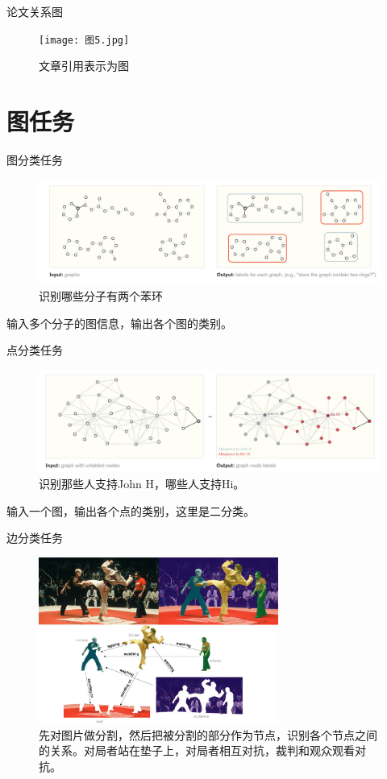 \documentclass{beamer}
\begin{document}
\begin{frame}{论文关系图}
    \begin{figure}
        \texttt{[image: 图5.jpg]}
        \caption{文章引用表示为图}
    \end{figure}
\end{frame}

\section{图任务}

\begin{frame}{图分类任务}
    \begin{figure}
        \includegraphics[width=\textwidth]{全局分类.jpg}
        \caption{识别哪些分子有两个苯环}
    \end{figure}
    输入多个分子的图信息，输出各个图的类别。
\end{frame}

\begin{frame}{点分类任务}
    \begin{figure}
        \includegraphics[width=\textwidth]{点分类.jpg}
        \caption{识别那些人支持John H，哪些人支持Hi。}
    \end{figure}
    输入一个图，输出各个点的类别，这里是二分类。
\end{frame}

\begin{frame}{边分类任务}
    \begin{figure}
        \includegraphics[width=0.7\textwidth]{边分类.jpg}
        \caption{先对图片做分割，然后把被分割的部分作为节点，识别各个节点之间的关系。对局者站在垫子上，对局者相互对抗，裁判和观众观看对抗。}
    \end{figure}
\end{frame}
\end{document}

